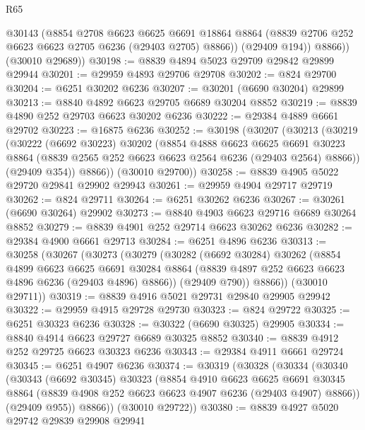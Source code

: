 \begin{lexlean}{R65}
\begin{coremodule}
{            @30143
            (@8854
              @2708
              @6623
              @6625
              @6691
              @18864
              @8864
              (@8839 @2706 @252 @6623 @6623 @2705 @6236 (@29403 @2705) @8866))
            (@29409 @194))
          @8866))
      (@30010 @29689))
@30198 := @8839 @4894 @5023 @29709 @29842 @29899 @29944
@30201 := @29959 @4893 @29706 @29708
@30202 := @824 @29700
@30204 := @6251 @30202 @6236
@30207 := @30201 (@6690 @30204) @29899
@30213 := @8840 @4892 @6623 @29705 @6689 @30204 @8852
@30219 := @8839 @4890 @252 @29703 @6623 @30202 @6236
@30222 := @29384 @4889 @6661 @29702
@30223 := @16875 @6236
@30252 := @30198
    (@30207
      (@30213
        (@30219
          (@30222
            (@6692 @30223)
            @30202
            (@8854
              @4888
              @6623
              @6625
              @6691
              @30223
              @8864
              (@8839 @2565 @252 @6623 @6623 @2564 @6236 (@29403 @2564) @8866))
            (@29409 @354))
          @8866))
      (@30010 @29700))
@30258 := @8839 @4905 @5022 @29720 @29841 @29902 @29943
@30261 := @29959 @4904 @29717 @29719
@30262 := @824 @29711
@30264 := @6251 @30262 @6236
@30267 := @30261 (@6690 @30264) @29902
@30273 := @8840 @4903 @6623 @29716 @6689 @30264 @8852
@30279 := @8839 @4901 @252 @29714 @6623 @30262 @6236
@30282 := @29384 @4900 @6661 @29713
@30284 := @6251 @4896 @6236
@30313 := @30258
    (@30267
      (@30273
        (@30279
          (@30282
            (@6692 @30284)
            @30262
            (@8854
              @4899
              @6623
              @6625
              @6691
              @30284
              @8864
              (@8839 @4897 @252 @6623 @6623 @4896 @6236 (@29403 @4896) @8866))
            (@29409 @790))
          @8866))
      (@30010 @29711))
@30319 := @8839 @4916 @5021 @29731 @29840 @29905 @29942
@30322 := @29959 @4915 @29728 @29730
@30323 := @824 @29722
@30325 := @6251 @30323 @6236
@30328 := @30322 (@6690 @30325) @29905
@30334 := @8840 @4914 @6623 @29727 @6689 @30325 @8852
@30340 := @8839 @4912 @252 @29725 @6623 @30323 @6236
@30343 := @29384 @4911 @6661 @29724
@30345 := @6251 @4907 @6236
@30374 := @30319
    (@30328
      (@30334
        (@30340
          (@30343
            (@6692 @30345)
            @30323
            (@8854
              @4910
              @6623
              @6625
              @6691
              @30345
              @8864
              (@8839 @4908 @252 @6623 @6623 @4907 @6236 (@29403 @4907) @8866))
            (@29409 @955))
          @8866))
      (@30010 @29722))
@30380 := @8839 @4927 @5020 @29742 @29839 @29908 @29941
}
\end{coremodule}
\end{lexlean}
